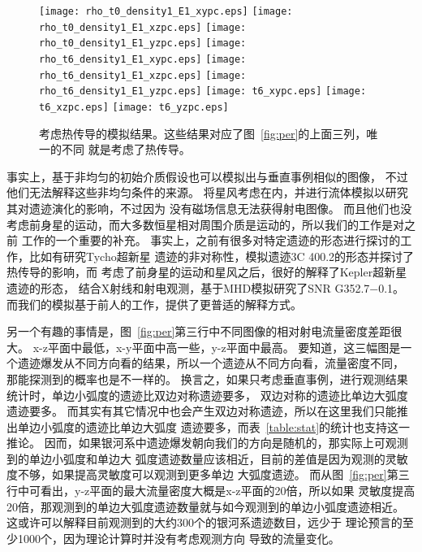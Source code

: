 \begin{figure*}
    \centering
    \texttt{[image: rho\_t0\_density1\_E1\_xypc.eps]}
    \texttt{[image: rho\_t0\_density1\_E1\_xzpc.eps]}
    \texttt{[image: rho\_t0\_density1\_E1\_yzpc.eps]}\newline
    \texttt{[image: rho\_t6\_density1\_E1\_xypc.eps]}
    \texttt{[image: rho\_t6\_density1\_E1\_xzpc.eps]}
    \texttt{[image: rho\_t6\_density1\_E1\_yzpc.eps]}\newline
    \texttt{[image: t6\_xypc.eps]}
    \texttt{[image: t6\_xzpc.eps]}
    \texttt{[image: t6\_yzpc.eps]}\newline
    \caption{考虑热传导的模拟结果。这些结果对应了图~\ref{fig:per}的上面三列，唯一的不同
    就是考虑了热传导。}
\label{fig:conduction}
\end{figure*}

事实上，\citet{Orlando2007}基于非均匀的初始介质假设也可以模拟出与垂直事例相似的图像，
不过他们无法解释这些非均匀条件的来源。
\citet{vanMarle2010}将星风考虑在内，并进行流体模拟以研究其对遗迹演化的影响，不过因为
没有磁场信息无法获得射电图像。
而且他们也没考虑前身星的运动，而大多数恒星相对周围介质是运动的，所以我们的工作是对之前
工作的一个重要的补充。
事实上，之前有很多对特定遗迹的形态进行探讨的工作，比如\citet{Vigh2011}有研究Tycho超新星
遗迹的非对称性，\citet{Schneiter2006}模拟遗迹3C 400.2的形态并探讨了热传导的影响，而
\citet{Toledo-Roy2014}考虑了前身星的运动和星风之后，很好的解释了Kepler超新星遗迹的形态，
\citet{Toledo-Roy2014a}结合X射线和射电观测，基于MHD模拟研究了SNR G352.7−0.1。
而我们的模拟基于前人的工作，提供了更普适的解释方式。

另一个有趣的事情是，图~\ref{fig:per}第三行中不同图像的相对射电流量密度差距很大。
x-z平面中最低，x-y平面中高一些，y-z平面中最高。
要知道，这三幅图是一个遗迹爆发从不同方向看的结果，所以一个遗迹从不同方向看，流量密度不同，
那能探测到的概率也是不一样的。
换言之，如果只考虑垂直事例，进行观测结果统计时，单边小弧度的遗迹比双边对称遗迹要多，
双边对称的遗迹比单边大弧度遗迹要多。
而其实有其它情况中也会产生双边对称遗迹，所以在这里我们只能推出单边小弧度的遗迹比单边大弧度
遗迹要多，而表~\ref{table:stat}的统计也支持这一推论。
因而，如果银河系中遗迹爆发朝向我们的方向是随机的，那实际上可观测到的单边小弧度和单边大
弧度遗迹数量应该相近，目前的差值是因为观测的灵敏度不够，如果提高灵敏度可以观测到更多单边
大弧度遗迹。
而从图~\ref{fig:per}第三行中可看出，y-z平面的最大流量密度大概是x-z平面的20倍，所以如果
灵敏度提高20倍，那观测到的单边大弧度遗迹数量就与如今观测到的单边小弧度遗迹相近。
这或许可以解释目前观测到的大约300个的银河系遗迹数目\citep{2014BASI...42...47G}，远少于
理论预言的至少1000个\citep{Frail1994a,Tammann1994}，因为理论计算时并没有考虑观测方向
导致的流量变化。

